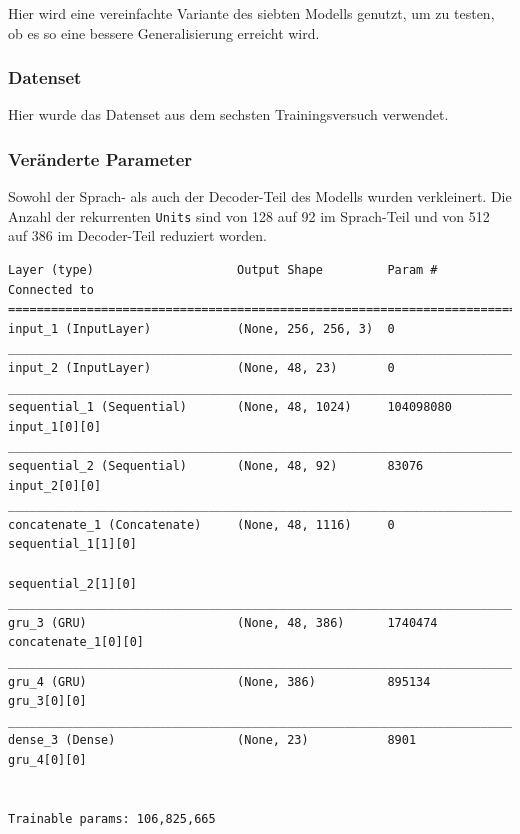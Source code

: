 \documentclass[pdftex,a4paper,halfparskip, article]{scrartcl}
\begin{document}
Hier wird eine vereinfachte Variante des siebten Modells genutzt, um zu testen, ob es so eine bessere Generalisierung erreicht wird.

\subsubsection*{Datenset}

Hier wurde das Datenset aus dem sechsten Trainingsversuch verwendet.

\subsubsection*{Veränderte Parameter}

Sowohl der Sprach- als auch der Decoder-Teil des Modells wurden verkleinert. Die Anzahl der rekurrenten \texttt{Units} sind von 128 auf 92 im Sprach-Teil und von 512 auf 386 im Decoder-Teil reduziert worden.

\begin{verbatim}
Layer (type)                    Output Shape         Param #     Connected to
=============================================================================
input_1 (InputLayer)            (None, 256, 256, 3)  0
_____________________________________________________________________________
input_2 (InputLayer)            (None, 48, 23)       0
_____________________________________________________________________________
sequential_1 (Sequential)       (None, 48, 1024)     104098080   input_1[0][0]
_____________________________________________________________________________
sequential_2 (Sequential)       (None, 48, 92)       83076       input_2[0][0]
_____________________________________________________________________________
concatenate_1 (Concatenate)     (None, 48, 1116)     0           sequential_1[1][0]
                                                                 sequential_2[1][0]
_____________________________________________________________________________
gru_3 (GRU)                     (None, 48, 386)      1740474     concatenate_1[0][0]
_____________________________________________________________________________
gru_4 (GRU)                     (None, 386)          895134      gru_3[0][0]
_____________________________________________________________________________
dense_3 (Dense)                 (None, 23)           8901        gru_4[0][0]


Trainable params: 106,825,665
\end{verbatim}
\end{document}
